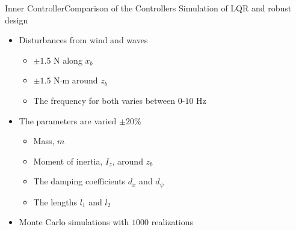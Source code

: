 \begin{frame}{Inner Controller}{Comparison of the Controllers}
  Simulation of LQR and robust design
  \begin{itemize}
    \item<1-> Disturbances from wind and waves
    \begin{itemize}
      \item<1-> $\pm 1.5$ N along $\dot{x}_b$
      \item<1-> $\pm 1.5$ N$\cdot$m around $z_b$
      \item<1-> The frequency for both varies between $0$-$10$ Hz 
    \end{itemize}
    \item<2-> The parameters are varied $\pm 20\%$
    \begin{itemize}
      \item<2-> Mass, $m$
      \item<2-> Moment of inertia, $I_z$, around $z_b$
      \item<2-> The damping coefficients $d_x$ and $d_\psi$
      \item<2-> The lengths $l_1$ and $l_2$
    \end{itemize}
  \item<3-> Monte Carlo simulations with $1000$ realizations
  \end{itemize}
\end{frame}


